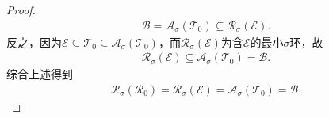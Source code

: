 \documentclass[../../main.tex]{subfiles}%
\begin{document}
\begin{proof}
\begin{align*}
\mathscr{B}=\mathscr{A}_\sigma(\mathscr{T}_0)\subseteq\mathscr{R}_\sigma(\mathscr{E}).
\end{align*}
反之，因为$\mathscr{E}\subseteq\mathscr{T}_0\subseteq\mathscr{A}_\sigma(\mathscr{T}_0)$，而$\mathscr{R}_\sigma(\mathscr{E})$为含$\mathscr{E}$的最小$\sigma$环，故
\begin{align*}
\mathscr{R}_\sigma(\mathscr{E})\subseteq\mathscr{A}_\sigma(\mathscr{T}_0)=\mathscr{B}.
\end{align*}
综合上述得到
\begin{align*}
\mathscr{R}_\sigma(\mathscr{R}_0)=\mathscr{R}_\sigma(\mathscr{E})=\mathscr{A}_\sigma(\mathscr{T}_0)=\mathscr{B}.
\end{align*}

\end{proof}
\end{document}
